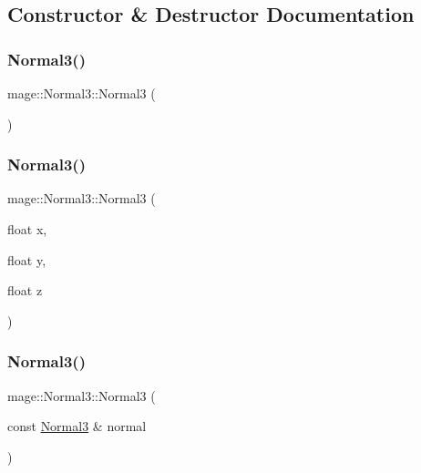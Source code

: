 \subsection{Constructor \& Destructor Documentation}
\hypertarget{structmage_1_1_normal3_a66ec99f0de4f8231f747e37a4da65cc4}{}\label{structmage_1_1_normal3_a66ec99f0de4f8231f747e37a4da65cc4} 
\subsubsection{\texorpdfstring{Normal3()}{Normal3()}\hspace{0.1cm}{\footnotesize\ttfamily [1/6]}}
{\footnotesize\ttfamily mage\+::\+Normal3\+::\+Normal3 (\begin{DoxyParamCaption}{ }\end{DoxyParamCaption})}

\hypertarget{structmage_1_1_normal3_a59094c1f96a9721cd8846c5c6ec06f93}{}\label{structmage_1_1_normal3_a59094c1f96a9721cd8846c5c6ec06f93} 
\subsubsection{\texorpdfstring{Normal3()}{Normal3()}\hspace{0.1cm}{\footnotesize\ttfamily [2/6]}}
{\footnotesize\ttfamily mage\+::\+Normal3\+::\+Normal3 (\begin{DoxyParamCaption}\item[{float}]{x,  }\item[{float}]{y,  }\item[{float}]{z }\end{DoxyParamCaption})}

\hypertarget{structmage_1_1_normal3_ada9c762e16b51177f3fc1aa6d5310b20}{}\label{structmage_1_1_normal3_ada9c762e16b51177f3fc1aa6d5310b20} 
\subsubsection{\texorpdfstring{Normal3()}{Normal3()}\hspace{0.1cm}{\footnotesize\ttfamily [3/6]}}
{\footnotesize\ttfamily mage\+::\+Normal3\+::\+Normal3 (\begin{DoxyParamCaption}\item[{const \hyperlink{structmage_1_1_normal3}{Normal3} \&}]{normal }\end{DoxyParamCaption})}

